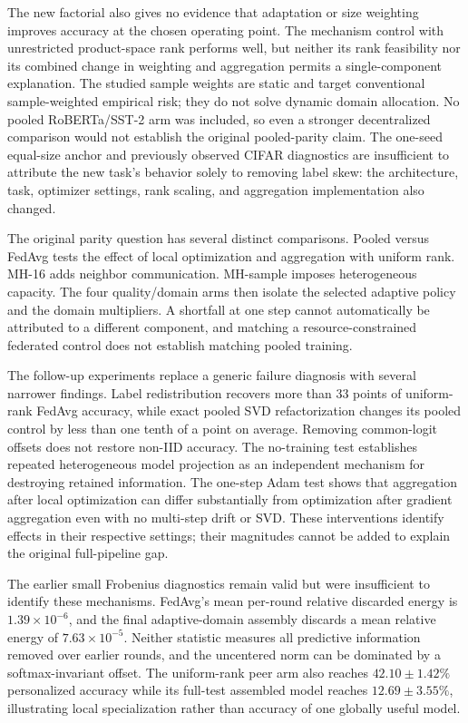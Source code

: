 \documentclass[11pt]{article}
\begin{document}
The new factorial also gives no evidence that adaptation or size weighting improves accuracy at the chosen operating point. The mechanism control with unrestricted product-space rank performs well, but neither its rank feasibility nor its combined change in weighting and aggregation permits a single-component explanation. The studied sample weights are static and target conventional sample-weighted empirical risk; they do not solve dynamic domain allocation. No pooled RoBERTa/SST-2 arm was included, so even a stronger decentralized comparison would not establish the original pooled-parity claim. The one-seed equal-size anchor and previously observed CIFAR diagnostics are insufficient to attribute the new task's behavior solely to removing label skew: the architecture, task, optimizer settings, rank scaling, and aggregation implementation also changed.

The original parity question has several distinct comparisons. Pooled versus FedAvg tests the effect of local optimization and aggregation with uniform rank. MH-16 adds neighbor communication. MH-sample imposes heterogeneous capacity. The four quality/domain arms then isolate the selected adaptive policy and the domain multipliers. A shortfall at one step cannot automatically be attributed to a different component, and matching a resource-constrained federated control does not establish matching pooled training.

The follow-up experiments replace a generic failure diagnosis with several narrower findings. Label redistribution recovers more than 33 points of uniform-rank FedAvg accuracy, while exact pooled SVD refactorization changes its pooled control by less than one tenth of a point on average. Removing common-logit offsets does not restore non-IID accuracy. The no-training test establishes repeated heterogeneous model projection as an independent mechanism for destroying retained information. The one-step Adam test shows that aggregation after local optimization can differ substantially from optimization after gradient aggregation even with no multi-step drift or SVD. These interventions identify effects in their respective settings; their magnitudes cannot be added to explain the original full-pipeline gap.

The earlier small Frobenius diagnostics remain valid but were insufficient to identify these mechanisms. FedAvg's mean per-round relative discarded energy is $1.39\times10^{-6}$, and the final adaptive-domain assembly discards a mean relative energy of $7.63\times10^{-5}$. Neither statistic measures all predictive information removed over earlier rounds, and the uncentered norm can be dominated by a softmax-invariant offset. The uniform-rank peer arm also reaches $42.10\pm1.42\%$ personalized accuracy while its full-test assembled model reaches $12.69\pm3.55\%$, illustrating local specialization rather than accuracy of one globally useful model.
\end{document}
